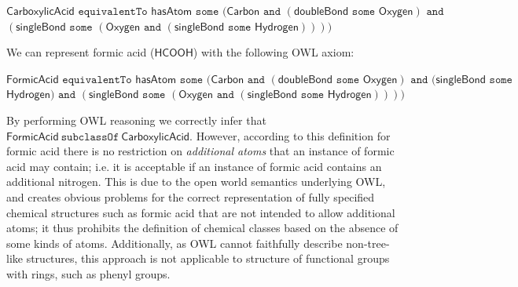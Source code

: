 \documentclass[10pt]{bmc_article}
\newenvironment{bmcformat}{\baselineskip20pt\sloppy\setboolean{publ}{false}}{\baselineskip20pt\sloppy}
\begin{document}
\begin{bmcformat}
\noindent $\mathsf{CarboxylicAcid} \texttt{ equivalentTo } \mathsf{hasAtom} \texttt{ some } 
	(\mathsf{Carbon} \texttt{ and } (\mathsf{doubleBond} \texttt{ some } \mathsf{Oxygen}) 
	    \texttt{ and }$ \\ \hspace*{24mm}$(\mathsf{singleBond} \texttt{ some } (\mathsf{Oxygen} \texttt{ and } (\mathsf{singleBond} \texttt{ some } \mathsf{Hydrogen}))))$

\noindent We can represent formic acid ($\mathsf{HCOOH}$) with the following OWL axiom:

\noindent $\mathsf{FormicAcid} \texttt{ equivalentTo } \mathsf{hasAtom} \texttt{ some } 
	( \mathsf{Carbon} \texttt{ and } (\mathsf{doubleBond} \texttt{ some } \mathsf{Oxygen}) \texttt{ and } (\mathsf{singleBond} \texttt{ some }$
	 \\ \hspace*{24mm}$ \mathsf{Hydrogen}) \texttt{ and } (\mathsf{singleBond} \texttt{ some } (\mathsf{Oxygen} \texttt{ and } (\mathsf{singleBond} \texttt{ some } \mathsf{Hydrogen}))))$
  
\noindent By performing OWL reasoning we correctly infer that $\mathsf{FormicAcid}~ \texttt{subclassOf}~ \mathsf{CarboxylicAcid}$. However, according to this definition for formic acid there is no restriction on \textit{additional atoms} that an instance of formic acid may contain; i.e. it is acceptable if an instance of formic acid contains an additional nitrogen. This is due to the open world semantics underlying OWL, and creates obvious problems for the correct representation of fully specified chemical structures such as formic acid that are not intended to allow additional atoms; it thus prohibits the definition of chemical classes based on the absence of some kinds of atoms. Additionally, as OWL cannot faithfully describe non-tree-like structures, this approach is not applicable to structure of functional groups with rings, such as phenyl groups. 


\end{bmcformat}
\end{document}
